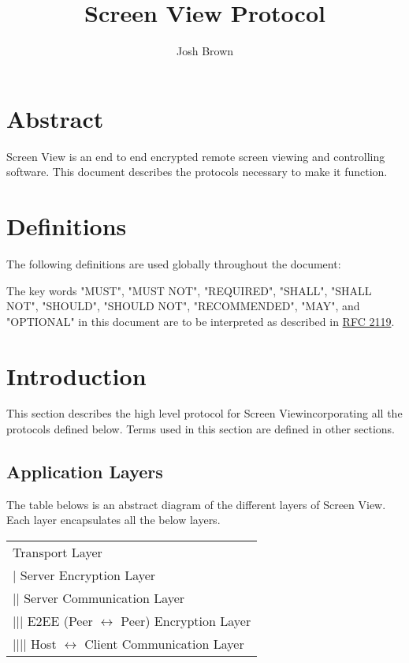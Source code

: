 \documentclass{article}
\title{Screen View Protocol}
\author{Josh Brown}
\newcommand{\projectName}{Screen View}
\begin{document}
    \maketitle
    \newpage


    \section{Abstract}
    \projectName{} is an end to end encrypted remote screen viewing and controlling software. This document describes
    the protocols necessary to make it function.
    \newpage


    \tableofcontents
    \newpage


    \section{Definitions}
    The following definitions are used globally throughout the document:


    The key words "MUST", "MUST NOT", "REQUIRED", "SHALL", "SHALL NOT",
    "SHOULD", "SHOULD NOT", "RECOMMENDED", "MAY", and "OPTIONAL" in this
    document are to be interpreted as described in \href{https://datatracker.ietf.org/doc/html/rfc2119}{RFC 2119}.

    \newpage


    \section{Introduction}

    This section describes the high level protocol for \projectName incorporating all the protocols defined below.
    Terms used in this section are defined in other sections.\\

    \subsection{Application Layers}

    The table belows is an abstract diagram of the different layers of \projectName. Each layer encapsulates all the
    below layers.

    \begin{center}
        \begin{tabular}{|l|}
            \hline
            Transport Layer                                         \\
            | Server Encryption Layer                               \\
            || Server Communication Layer                           \\
            ||| E2EE (Peer $\leftrightarrow$ Peer) Encryption Layer \\
            |||| Host $\leftrightarrow$ Client Communication Layer  \\
            \hline
        \end{tabular}
    \end{center}
\end{document}
